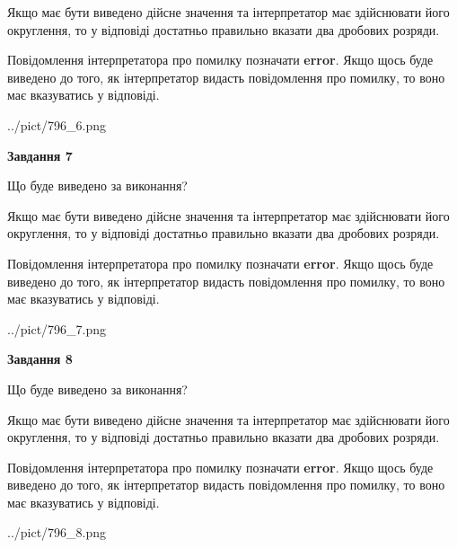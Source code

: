 \documentclass[12pt, ukrainian]{article}
\begin{document}
{\begin {Large}
Якщо має бути виведено дійсне значення та інтерпретатор має здійснювати його округлення, 
то у відповіді достатньо правильно вказати два дробових розряди.

Повідомлення інтерпретатора про помилку позначати \textbf{error}.
Якщо щось буде виведено до того, як інтерпретатор видасть повідомлення про помилку, 
то воно має вказуватись у відповіді. \par

\begin{center}
	{../pict/796_6.png}
\end{center}
\newpage

{\begin {center}\textbf{Завдання 7}\end {center}}\par
Що буде виведено за виконання? \par

Якщо має бути виведено дійсне значення та інтерпретатор має здійснювати його округлення, 
то у відповіді достатньо правильно вказати два дробових розряди.

Повідомлення інтерпретатора про помилку позначати \textbf{error}.
Якщо щось буде виведено до того, як інтерпретатор видасть повідомлення про помилку, 
то воно має вказуватись у відповіді. \par

\begin{center}
	{../pict/796_7.png}
\end{center}
\newpage

{\begin {center}\textbf{Завдання 8}\end {center}}\par
Що буде виведено за виконання? \par

Якщо має бути виведено дійсне значення та інтерпретатор має здійснювати його округлення, 
то у відповіді достатньо правильно вказати два дробових розряди.

Повідомлення інтерпретатора про помилку позначати \textbf{error}.
Якщо щось буде виведено до того, як інтерпретатор видасть повідомлення про помилку, 
то воно має вказуватись у відповіді. \par

\begin{center}
	{../pict/796_8.png}
\end{center}
\newpage


\end{Large}}
\end{document}
